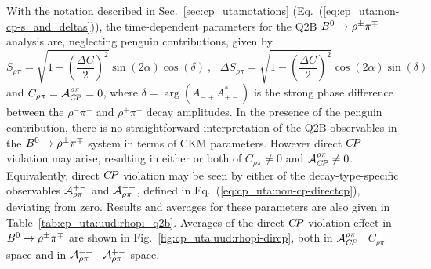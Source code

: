 With the notation described in Sec.~\ref{sec:cp_uta:notations}
(Eq.~(\ref{eq:cp_uta:non-cp-s_and_deltas})), 
the time-dependent parameters for the Q2B $B^0 \to \rho^\pm\pi^\mp$ analysis are,
neglecting penguin contributions, given by
\begin{equation}
  S_{\rho\pi} = 
  \sqrt{1 - \left(\frac{\Delta C}{2}\right)^2}\sin(2\alpha)\cos(\delta)
  \ , \ \ \ 
  \Delta S_{\rho\pi} = 
  \sqrt{1 - \left(\frac{\Delta C}{2}\right)^2}\cos(2\alpha)\sin(\delta)
\end{equation} 
and $C_{\rho\pi} = {\cal A}_{C\!P}^{\rho\pi} = 0$,
where $\delta=\arg(A_{-+}A^*_{+-})$ is the strong phase difference 
between the $\rho^-\pi^+$ and $\rho^+\pi^-$ decay amplitudes.
In the presence of the penguin contribution, there is no straightforward 
interpretation of the Q2B observables in the $B^0 \to \rho^\pm\pi^\mp$ system
in terms of CKM parameters.
However direct $C\!P$ violation may arise,
resulting in either or both of $C_{\rho\pi} \neq 0$ and ${\cal A}_{C\!P}^{\rho\pi} \neq 0$.
Equivalently,
direct $C\!P$ violation may be seen by either of
the decay-type-specific observables ${\cal A}^{+-}_{\rho\pi}$ 
and ${\cal A}^{-+}_{\rho\pi}$, defined in Eq.~(\ref{eq:cp_uta:non-cp-directcp}), 
deviating from zero.
Results and averages for these parameters
are also given in Table~\ref{tab:cp_uta:uud:rhopi_q2b}.
Averages of the direct $C\!P$ violation effect in $B^0 \to \rho^\pm\pi^\mp$
are shown in Fig.~\ref{fig:cp_uta:uud:rhopi-dircp},
both in 
${\cal A}^{\rho\pi}_{C\!P}$ \vs\ $C_{\rho\pi}$ space and in 
${\cal A}^{-+}_{\rho\pi}$ \vs\ ${\cal A}^{+-}_{\rho\pi}$ space.

